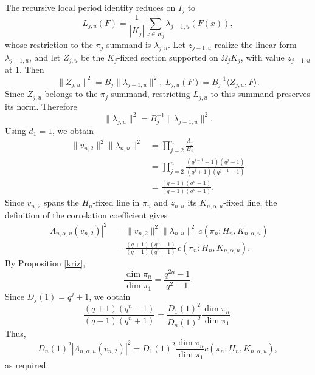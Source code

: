 \documentclass[12pt]{amsart}
\theoremstyle{definition}
\theoremstyle{remark}
\begin{document}
The recursive local period identity reduces on $I_j$ to
\[
L_{j,u}(F)
=\frac{1}{|K_j|}
\sum_{x\in K_j}\lambda_{j-1,u}(F(x)),
\]
whose restriction to the $\pi_j$-summand is $\lambda_{j,u}$. Let $z_{j-1,u}$ realize the linear form $\lambda_{j-1,u}$, and let $Z_{j,u}$ be the $K_j$-fixed section supported on $\Omega_jK_j$, with value $z_{j-1,u}$ at $1$. Then
\[
\|Z_{j,u}\|^2=B_j\|\lambda_{j-1,u}\|^2,
~
L_{j,u}(F)=B_j^{-1}\langle Z_{j,u}, F \rangle.
\]
Since $Z_{j,u}$ belongs to the $\pi_j$-summand, restricting $L_{j,u}$ to this summand preserves its norm. Therefore
\[
\|\lambda_{j,u}\|^2
=B_j^{-1}\|\lambda_{j-1,u}\|^2.
\]
Using $d_1=1$, we obtain
\[
\begin{aligned}
\|v_{n,2}\|^2\|\lambda_{n,u}\|^2
&=\prod_{j=2}^{n}\frac{A_j}{B_j}\\
&=\prod_{j=2}^{n}
\frac{(q^{j-1}+1)(q^j-1)}
     {(q^j+1)(q^{j-1}-1)}\\
&=\frac{(q+1)(q^n-1)}{(q-1)(q^n+1)}.
\end{aligned}
\]
Since $v_{n,2}$ spans the $H_n$-fixed line in $\pi_n$ and $z_{n,u}$ its $K_{n,\alpha,u}$-fixed line, the definition of the correlation coefficient gives
\begin{align*}
|\Lambda_{n,\alpha,u}(v_{n,2})|^2
&=\|v_{n,2}\|^2\|\lambda_{n,u}\|^2
\,c(\pi_n;H_n,K_{n,\alpha,u})\\
&=\frac{(q+1)(q^n-1)}{(q-1)(q^n+1)}
\,c(\pi_n;H_n,K_{n,\alpha,u}).
\end{align*}
By Proposition \ref{kriz},
\[
\frac{\dim\pi_n}{\dim\pi_1}
=\frac{q^{2n}-1}{q^2-1}.
\]
Since $D_j(1)=q^j+1$, we obtain
\[
\frac{(q+1)(q^n-1)}{(q-1)(q^n+1)}
=
\frac{D_1(1)^2}{D_n(1)^2}
\frac{\dim\pi_n}{\dim\pi_1}.
\]
Thus,
\[
D_n(1)^2\left|\Lambda_{n,\alpha,u}(v_{n,2})\right|^2
=
D_1(1)^2\frac{\dim\pi_n}{\dim\pi_1}
c(\pi_n;H_n,K_{n,\alpha,u}),
\]
as required.

%
%
\end{document}
